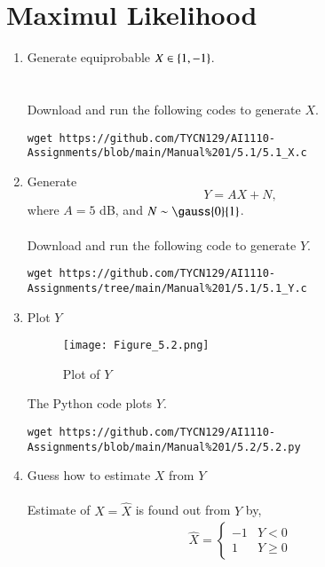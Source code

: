 \documentclass[journal,12pt,twocolumn]{IEEEtran}
\renewcommand\thesection{\arabic{section}}
\begin{document}
\section{Maximul Likelihood}
\begin{enumerate}[label=\thesection.\arabic*
,ref=\thesection.\theenumi]
\item Generate equiprobable $X \in \left\{1,-1\right\}$.\\
\solution\\
\\
Download and run the following codes to generate $X$.\\
\begin{lstlisting}
wget https://github.com/TYCN129/AI1110-Assignments/blob/main/Manual%201/5.1/5.1_X.c
\end{lstlisting}

\item Generate 
\begin{equation}
Y = AX+N,
\end{equation}
		where $A = 5$ dB,  and $N \sim \gauss{0}{1}$.\\
\solution\\
Download and run the following code to generate $Y$.
\begin{lstlisting}
wget https://github.com/TYCN129/AI1110-Assignments/tree/main/Manual%201/5.1/5.1_Y.c
\end{lstlisting}
\clearpage
\item Plot $Y$\\
\solution
\begin{figure}[H]
    \centering
    \texttt{[image: Figure\_5.2.png]}
    \caption{Plot of $Y$}
    \label{fig:my_label}
\end{figure}
The Python code plots $Y$.
\begin{lstlisting}
wget https://github.com/TYCN129/AI1110-Assignments/blob/main/Manual%201/5.2/5.2.py
\end{lstlisting}
\item Guess how to estimate $X$ from $Y$\\
\solution\\
Estimate of $X = \hat{X}$ is found out from $Y$ by,
\begin{align}
    \hat{X} = \begin{cases}
    -1 & Y < 0\\
    1 & Y \geq 0
    \end{cases}
\end{align}


\end{enumerate}
\end{document}
